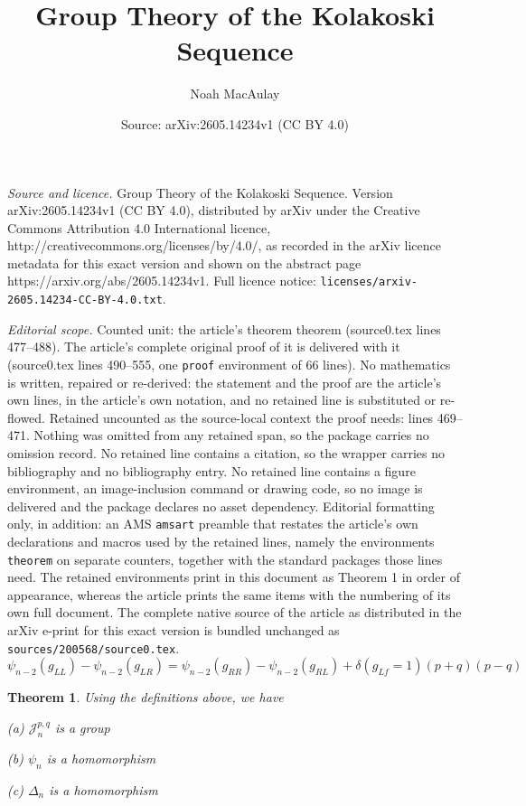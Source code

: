 \documentclass[10pt,a4paper]{amsart}
\title{Group Theory of the Kolakoski Sequence}
\author{Noah MacAulay}
\date{Source: arXiv:2605.14234v1 (CC BY 4.0)}
\newtheorem{theorem}{Theorem}
\begin{document}
\maketitle

\noindent\emph{Source and licence.} Group Theory of the Kolakoski Sequence. Version arXiv:2605.14234v1 (CC BY 4.0), distributed by arXiv under the Creative Commons Attribution 4.0 International licence, http://creativecommons.org/licenses/by/4.0/, as recorded in the arXiv licence metadata for this exact version and shown on the abstract page https://arxiv.org/abs/2605.14234v1. Full licence notice: \texttt{licenses/arxiv-2605.14234-CC-BY-4.0.txt}.\par\smallskip

\noindent\textit{Editorial scope.} Counted unit: the article's theorem theorem (source0.tex lines 477--488). The article's complete original proof of it is delivered with it (source0.tex lines 490--555, one \texttt{proof} environment of 66 lines). No mathematics is written, repaired or re-derived: the statement and the proof are the article's own lines, in the article's own notation, and no retained line is substituted or re-flowed.  Retained uncounted as the source-local context the proof needs: lines 469--471.  Nothing was omitted from any retained span, so the package carries no omission record.  No retained line contains a citation, so the wrapper carries no bibliography and no bibliography entry.  No retained line contains a figure environment, an image-inclusion command or drawing code, so no image is delivered and the package declares no asset dependency.  Editorial formatting only, in addition: an AMS \texttt{amsart} preamble that restates the article's own declarations and macros used by the retained lines, namely the environments \texttt{theorem} on separate counters, together with the standard packages those lines need.  The retained environments print in this document as Theorem 1 in order of appearance, whereas the article prints the same items with the numbering of its own full document.  The complete native source of the article as distributed in the arXiv e-print for this exact version is bundled unchanged as \texttt{sources/200568/source0.tex}.
\begin{equation}\label{defin}
    \psi_{n-2}(g_{LL}) - \psi_{n-2}(g_{LR}) = \psi_{n-2}(g_{RR}) - \psi_{n-2}(g_{RL}) + \delta(g_{Lf}=1)(p+q)(p-q)
\end{equation}

\begin{theorem}
    Using the definitions above, we have
    
    (a) $\mathcal{J}_n ^{p,q}$ is a group
    
    (b) $\psi_n$ is a homomorphism
    
    
    (c) $\Delta_n$ is a homomorphism
    
    
\end{theorem}
\end{document}
